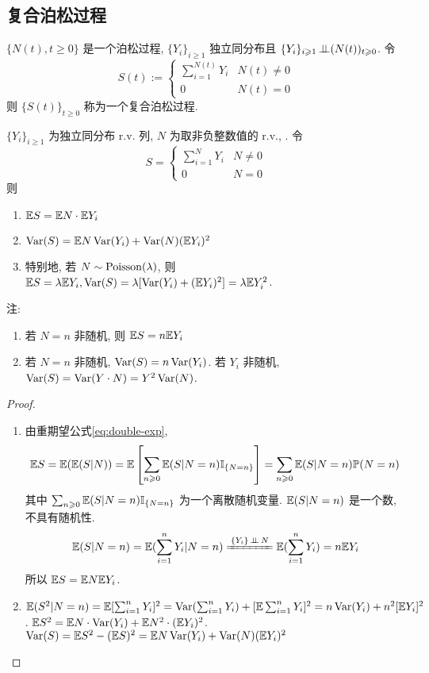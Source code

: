 \subsection{复合泊松过程}

\begin{definition}
    $\{N(t),t\geq 0\}$ 是一个泊松过程, $\{Y_i\}_{i\geq 1}$ 独立同分布且 $\{Y_i\}_{i\geqslant 1}\operatorname{\perp\!\!\!\perp} (N(t))_{t\geqslant 0}$. 令
    \[
    S(t):=\begin{cases}
        \sum_{i=1}^{N(t)}Y_i & N(t)\neq 0\\
        0 & N(t)=0
    \end{cases}
    \]
    则 $\{S(t)\}_{t\geq 0}$ 称为一个复合泊松过程.
\end{definition}

\begin{theorem}
    $\{Y_i\}_{i\geq 1}$ 为独立同分布 r.v. 列, $N$ 为取非负整数值的 r.v., . 令
    \[
    S=\begin{cases}
        \sum_{i=1}^N Y_i & N\neq 0\\
        0 & N=0
    \end{cases}
    \]
    则
    \begin{enumerate}
        \item $\mathbb E S=\mathbb E N\cdot \mathbb E Y_i$
        \item $\operatorname{Var} (S)=\mathbb E N \operatorname{Var}(Y_i)+\operatorname{Var}(N)(\mathbb E Y_i)^2$
        \item 特别地, 若 $N\sim \operatorname{Poisson}(\lambda)$, 则 $\mathbb E S=\lambda\mathbb E Y_i,\operatorname{Var}(S)=\lambda[\operatorname{Var}(Y_i)+(\mathbb E Y_i)^2]=\lambda \mathbb E Y_i^2$.
    \end{enumerate}
\end{theorem}
注:
\begin{enumerate}
    \item 若 $N=n$ 非随机, 则 $\mathbb E S=n\mathbb E Y_i$
    \item 若 $N=n$ 非随机, $\operatorname{Var}(S)=n\operatorname{Var}(Y_i)$. 若 $Y_i$ 非随机, $\operatorname{Var}(S)=\operatorname{Var}(Y\cdot N)=Y^2\operatorname{Var}(N)$.
\end{enumerate}

\begin{proof}
    \begin{enumerate}
        \item 由重期望公式\eqref{eq:double-exp}, 
        \[
        \mathbb E S=\mathbb E(\mathbb E(S|N))=\mathbb E\left[\sum_{n\geqslant 0}\mathbb E(S|N=n)\mathbb I_{\{N=n\}}\right]=\sum_{n\geqslant 0}\mathbb E(S|N=n)\mathbb{P}(N=n)
        \]
        其中 $\sum_{n\geqslant 0}\mathbb E(S|N=n)\mathbb I_{\{N=n\}}$ 为一个离散随机变量. $\mathbb E(S|N=n)$ 是一个数, 不具有随机性.
        \[
        \EE(S|N=n)=\EE(\sum_{i=1}^n Y_i|N=n)\xlongequal{\{Y_i\}\ind N}\EE(\sum_{i=1}^n Y_i)=n\EE Y_i
        \]
        所以 $\mathbb E S=\mathbb E N\mathbb E Y_i$.
        \item $\mathbb E(S^2|N=n)=\mathbb E[\sum_{i=1}^n Y_i]^2=\operatorname{Var}(\sum_{i=1}^n Y_i)+[\mathbb E \sum_{i=1}^n Y_i]^2=n\operatorname{Var}(Y_i)+n^2[\mathbb E Y_i]^2$. $\mathbb E S^2=\mathbb E N\cdot \operatorname{Var}(Y_i)+\mathbb E N^2\cdot (\mathbb E Y_i)^2$. $\operatorname{Var}(S)=\mathbb E S^2-(\mathbb E S)^2=\mathbb E N\operatorname{Var}(Y_i)+\operatorname{Var}(N)(\mathbb E Y_i)^2$
    \end{enumerate}
\end{proof}
\newpage